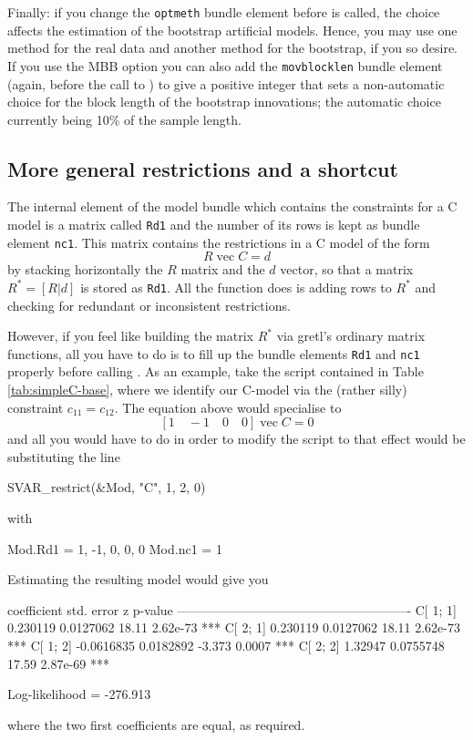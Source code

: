 \documentclass[a4paper,10pt]{article}
\newcommand{\app}[1]{\textsf{#1}}
\newcommand{\dtk}[1]{\texttt{\detokenize{#1}}}
\newcounter{script}[section]
\DeclareMathOperator{\VEC}{\mathrm{vec}}
\begin{document}
Finally: if you change the \texttt{optmeth} bundle element before
\dtk{SVAR_boot} is called, the choice affects the estimation of
the bootstrap artificial models. Hence, you may use one method for the
real data and another method for the bootstrap, if you so desire. 
If you use the MBB option you can also add the \texttt{movblocklen} 
bundle element (again, before the call to \dtk{SVAR_boot}) to give a 
positive integer that sets a non-automatic choice for the block length of the
bootstrap innovations; the automatic choice currently being 10\% of the 
sample length.

\subsection{More general restrictions and a shortcut}
\label{sec:OtherConstraints}

The internal element of the model bundle which contains the
constraints for a C model is a matrix called \texttt{Rd1} and the
number of its rows is kept as bundle element \texttt{nc1}. This matrix
contains the restrictions in a C model of the form
\[
  R \VEC C = d
\]
by stacking horizontally the $R$ matrix and the $d$ vector, so that a
matrix $R^* = [R | d ]$ is stored as \texttt{Rd1}. All the
\dtk{SVAR_restrict} function does is adding rows to $R^*$ and
checking for redundant or inconsistent restrictions.

However, if you feel like building the matrix $R^*$ via \app{gretl}'s
ordinary matrix functions, all you have to do is to fill up the bundle
elements \texttt{Rd1} and \texttt{nc1} properly before calling
\dtk{SVAR_estimate()}. As an example, take the script contained in
Table \ref{tab:simpleC-base}, where we identify our C-model via the
(rather silly) constraint $c_{11} = c_{12}$. The equation above would
specialise to
\[
  [1 \quad -1 \quad 0 \quad 0 ] \VEC C = 0
\]
and all you would have to do in order to modify the script to that
effect would be substituting the line
\begin{code}
SVAR_restrict(&Mod, "C", 1, 2, 0)
\end{code}
with
\begin{code}
Mod.Rd1 = {1, -1, 0, 0, 0}
Mod.nc1 = 1
\end{code}
Estimating the resulting model would give you
\begin{code}

             coefficient   std. error     z      p-value 
  -------------------------------------------------------
  C[ 1; 1]    0.230119     0.0127062    18.11    2.62e-73 ***
  C[ 2; 1]    0.230119     0.0127062    18.11    2.62e-73 ***
  C[ 1; 2]   -0.0616835    0.0182892    -3.373   0.0007   ***
  C[ 2; 2]    1.32947      0.0755748    17.59    2.87e-69 ***

  Log-likelihood = -276.913
\end{code}
where the two first coefficients are equal, as required.
\end{document}
